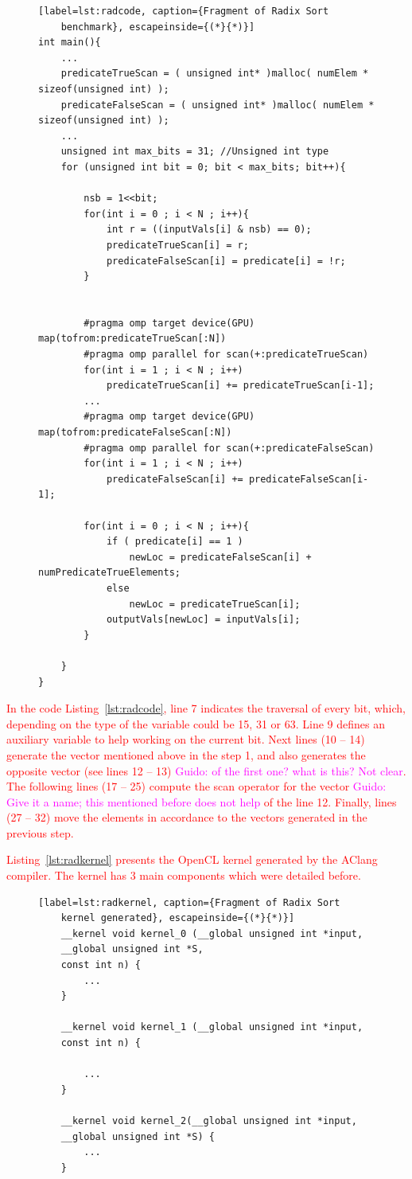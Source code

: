 \documentclass[Ingles]{ic-tese-v1}
\newcommand{\guido}[1]{\noindent\textcolor{magenta}{Guido: {#1}}}
\newcommand{\ed}[1]{\noindent\textcolor{red}{ {#1}}}
\newcommand{\guido}[1]{}
\newcommand{\ed}[1]{}
\newcommand{\rlst}[1]{Listing~\ref{lst:#1}}
\begin{document}
\begin{figure}[t]
	\lstset{basicstyle=\scriptsize}
	\begin{lstlisting}[label=lst:radcode, caption={Fragment of Radix Sort
	benchmark}, escapeinside={(*}{*)}]
int main(){
	...
	predicateTrueScan = ( unsigned int* )malloc( numElem * sizeof(unsigned int) );
	predicateFalseScan = ( unsigned int* )malloc( numElem * sizeof(unsigned int) );
	...
	unsigned int max_bits = 31; //Unsigned int type
	for (unsigned int bit = 0; bit < max_bits; bit++){

		nsb = 1<<bit;
		for(int i = 0 ; i < N ; i++){
			int r = ((inputVals[i] & nsb) == 0);
			predicateTrueScan[i] = r;
			predicateFalseScan[i] = predicate[i] = !r;
		}


		#pragma omp target device(GPU) map(tofrom:predicateTrueScan[:N])
		#pragma omp parallel for scan(+:predicateTrueScan)
		for(int i = 1 ; i < N ; i++)
			predicateTrueScan[i] += predicateTrueScan[i-1];
		...
		#pragma omp target device(GPU) map(tofrom:predicateFalseScan[:N])
		#pragma omp parallel for scan(+:predicateFalseScan)
		for(int i = 1 ; i < N ; i++)
			predicateFalseScan[i] += predicateFalseScan[i-1];

		for(int i = 0 ; i < N ; i++){
			if ( predicate[i] == 1 )
				newLoc = predicateFalseScan[i] + numPredicateTrueElements;
			else
				newLoc = predicateTrueScan[i];
			outputVals[newLoc] = inputVals[i];
		}

	}
}
	\end{lstlisting}
\end{figure}

\ed{In the code \rlst{radcode}, line 7 indicates the traversal of  every bit, which, depending on the
type of the variable could be 15, 31 or 63. Line 9 defines an auxiliary variable to help
working on  the current bit. Next lines (10 -- 14) generate the vector mentioned above
in the step 1, and also generates the opposite vector (see lines 12 -- 13) \guido{of the first one? what is this? Not clear}. 
The following lines (17 -- 25) compute the scan operator for the vector \guido{Give it a name; this mentioned before does not help} 
of the line 12. Finally, lines (27 -- 32) move the elements in accordance to the vectors generated in the previous step.}

\ed{\rlst{radkernel} presents the OpenCL kernel generated by the AClang compiler. 
The kernel has 3 main components which were detailed before.}

\begin{figure}[t]
	\lstset{basicstyle=\scriptsize}
	\begin{lstlisting}[label=lst:radkernel, caption={Fragment of Radix Sort
	kernel generated}, escapeinside={(*}{*)}]
	__kernel void kernel_0 (__global unsigned int *input,
	__global unsigned int *S,
	const int n) {
		...
	}

	__kernel void kernel_1 (__global unsigned int *input,
	const int n) {

		...
	}

	__kernel void kernel_2(__global unsigned int *input,
	__global unsigned int *S) {
		...
	}
	\end{lstlisting}
\end{figure}
\end{document}
